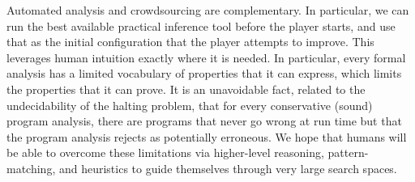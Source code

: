\documentclass{sig-alternate}
\begin{document}
Automated analysis and crowdsourcing are complementary.  In
particular, we can run the best available practical inference tool
before the player starts, and use that as the initial configuration
that the player attempts to improve.  This leverages human intuition
exactly where it is needed.  In particular, every formal analysis has
a limited vocabulary of properties that it can express, which limits
the properties that it can prove.  It is an unavoidable fact, related
to the undecidability of the halting problem, that for every
conservative (sound) program analysis, there are programs that never
go wrong at run time but that the program analysis rejects as
potentially erroneous.  We hope that humans will be able to overcome
these limitations via higher-level reasoning, pattern-matching, and
heuristics to guide themselves through very large search spaces.

\end{document}
